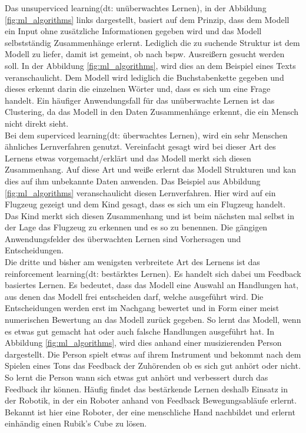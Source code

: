 \begin{onehalfspace}
        Das \glqq{}unsuperviced learning\grqq{}(\ac*{dt}: unüberwachtes Lernen), in der Abbildung \ref*{fig:ml_algorithms} links dargestellt, basiert auf dem Prinzip, dass dem Modell ein Input ohne zusätzliche Informationen gegeben wird und das Modell selbstständig Zusammenhänge erlernt. Lediglich die zu suchende Struktur ist dem Modell zu liefer, damit ist gemeint, ob nach bspw. Ausreißern gesucht werden soll. In der Abbildung  \ref*{fig:ml_algorithms}, wird dies an dem Beispiel eines Texts veranschaulicht. Dem Modell wird lediglich die Buchstabenkette gegeben und dieses erkennt darin die einzelnen Wörter und, dass es sich um eine Frage handelt. Ein häufiger Anwendungsfall für das unüberwachte Lernen ist das Clustering, da das Modell in den Daten Zusammenhänge erkennt, die ein Mensch nicht direkt sieht.\cite{Datenkommission2019}\cite{Döbel2018} \\
        Bei dem \glqq{}superviced learning\grqq{}(\ac*{dt}: überwachtes Lernen), wird ein sehr Menschen ähnliches Lernverfahren genutzt. Vereinfacht gesagt wird bei dieser Art des Lernens etwas vorgemacht/erklärt und das Modell merkt sich diesen Zusammenhang. Auf diese Art und weiße erlernt das Modell Strukturen und kan dies auf ihm unbekannte Daten anwenden. Das Beispiel aus Abbildung \ref*{fig:ml_algorithms} veranschaulicht diesen Lernverfahren. Hier wird auf ein Flugzeug gezeigt und dem Kind gesagt, dass es sich um ein Flugzeug handelt. Das Kind merkt sich diesen Zusammenhang und ist beim nächsten mal selbst in der Lage das Flugzeug zu erkennen und es so zu benennen. Die gängigen Anwendungsfelder des überwachten Lernen sind Vorhersagen und Entscheidungen.\cite{Döbel2018} \\
        Die dritte und bisher am wenigsten verbreitete Art des Lernens ist das \glqq{}reinforcement learning\grqq{}(\ac*{dt}: bestärktes Lernen). Es handelt sich dabei um Feedback basiertes Lernen. Es bedeutet, dass das Modell eine Auswahl an Handlungen hat, aus denen das Modell frei entscheiden darf, welche ausgeführt wird. Die Entscheidungen werden erst im Nachgang bewertet und in Form einer meist numerischen Bewertung an das Modell zurück gegeben. So lernt das Modell, wenn es etwas gut gemacht hat oder auch falsche Handlungen ausgeführt hat. In Abbildung \ref*{fig:ml_algorithms}, wird dies anhand einer musizierenden Person dargestellt. Die Person spielt etwas auf ihrem Instrument und bekommt nach dem Spielen eines Tons das Feedback der Zuhörenden ob es sich gut anhört oder nicht. So lernt die Person wann sich etwas gut anhört und verbessert durch das Feedback ihr können. Häufig findet das bestärkende Lernen deshalb Einsatz in der Robotik, in der ein Roboter anhand von Feedback Bewegungsabläufe erlernt. Bekannt ist hier eine Roboter, der eine menschliche Hand nachbildet und erlernt einhändig einen Rubik’s Cube zu lösen.\cite{Horn2022}\cite{Döbel2018}\cite{Rubik2019}

\end{onehalfspace}
